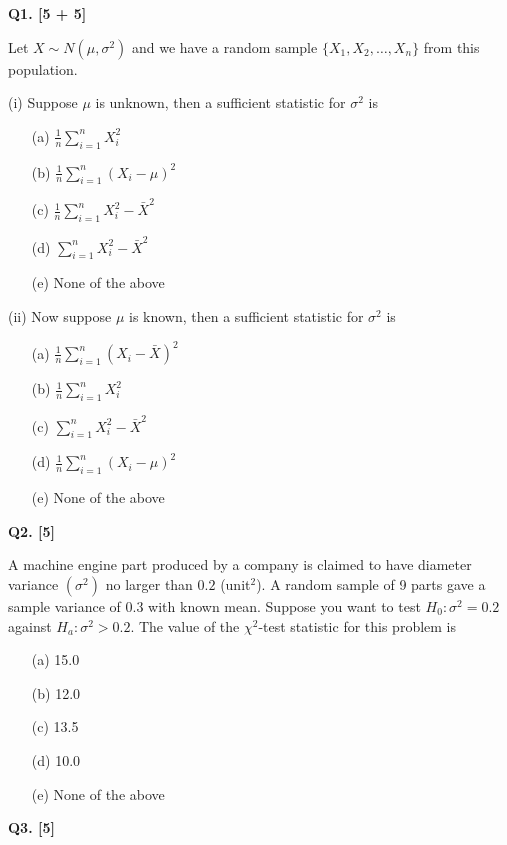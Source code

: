 \documentclass[11pt]{article}
\begin{document}
\medskip
\textbf{Q1. [5 + 5]}

Let $X\sim N(\mu,\sigma^2)$ and we have a random sample $\{X_1,X_2,\ldots,X_n\}$ from this population.

\medskip
(i) Suppose $\mu$ is unknown, then a sufficient statistic for $\sigma^2$ is
\begin{enumerate}
\setlength{\itemsep}{0pt}\setlength{\parsep}{0pt}\setlength{\topsep}{2pt}
\item[(a)] $\frac{1}{n}\sum_{i=1}^n X_i^2$
\item[(b)] $\frac{1}{n}\sum_{i=1}^n (X_i-\mu)^2$
\item[(c)] $\frac{1}{n}\sum_{i=1}^n X_i^2-\bar X^2$
\item[(d)] $\sum_{i=1}^n X_i^2-\bar X^2$
\item[(e)] None of the above
\end{enumerate}

\medskip
(ii) Now suppose $\mu$ is known, then a sufficient statistic for $\sigma^2$ is
\begin{enumerate}
\setlength{\itemsep}{0pt}\setlength{\parsep}{0pt}\setlength{\topsep}{2pt}
\item[(a)] $\frac{1}{n}\sum_{i=1}^n (X_i-\bar X)^2$
\item[(b)] $\frac{1}{n}\sum_{i=1}^n X_i^2$
\item[(c)] $\sum_{i=1}^n X_i^2-\bar X^2$
\item[(d)] $\frac{1}{n}\sum_{i=1}^n (X_i-\mu)^2$
\item[(e)] None of the above
\end{enumerate}

\medskip
\textbf{Q2. [5]}

A machine engine part produced by a company is claimed to have diameter variance $(\sigma^2)$ no larger than $0.2$ (unit$^2$). A random sample of 9 parts gave a sample variance of $0.3$ with known mean. Suppose you want to test $H_0:\sigma^2=0.2$ against $H_a:\sigma^2>0.2$. The value of the $\chi^2$-test statistic for this problem is
\begin{enumerate}
\setlength{\itemsep}{0pt}\setlength{\parsep}{0pt}\setlength{\topsep}{2pt}
\item[(a)] 15.0
\item[(b)] 12.0
\item[(c)] 13.5
\item[(d)] 10.0
\item[(e)] None of the above
\end{enumerate}

\medskip
\textbf{Q3. [5]}
\end{document}
